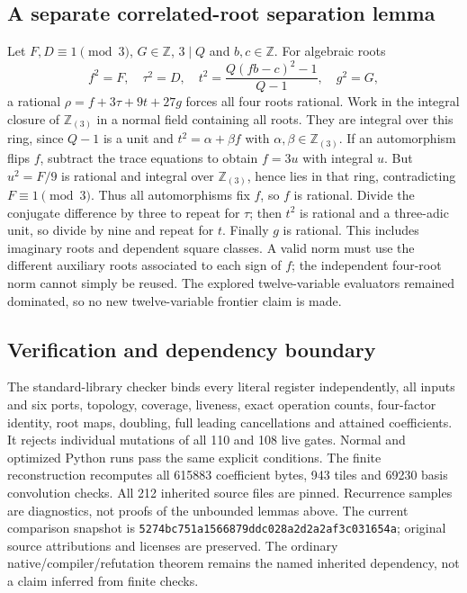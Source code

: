 \subsection{A separate correlated-root separation lemma}
Let $F,D\equiv1\pmod3$, $G\in\mathbb Z$, $3\mid Q$ and $b,c\in\mathbb Z$.
For algebraic roots
\[
 f^2=F,\quad\tau^2=D,\quad
 t^2=\frac{Q(fb-c)^2-1}{Q-1},\quad g^2=G,
\]
a rational $\rho=f+3\tau+9t+27g$ forces all four roots rational.
Work in the integral closure of $\mathbb Z_{(3)}$ in a normal field containing
all roots. They are integral over this ring, since $Q-1$ is a unit and
$t^2=\alpha+\beta f$ with $\alpha,\beta\in\mathbb Z_{(3)}$.
If an automorphism flips $f$, subtract the trace equations to obtain $f=3u$
with integral $u$. But $u^2=F/9$ is rational and integral over $\mathbb Z_{(3)}$,
hence lies in that ring, contradicting $F\equiv1\pmod3$. Thus all automorphisms
fix $f$, so $f$ is rational. Divide the conjugate difference by three to repeat
for $\tau$; then $t^2$ is rational and a three-adic unit, so divide by nine and
repeat for $t$. Finally $g$ is rational. This includes imaginary roots and
dependent square classes. A valid norm must use the different auxiliary roots
associated to each sign of $f$; the independent four-root norm cannot simply be
reused. The explored twelve-variable evaluators remained dominated, so no new
twelve-variable frontier claim is made.

\subsection{Verification and dependency boundary}
The standard-library checker binds every literal register independently, all
inputs and six ports, topology, coverage, liveness, exact operation counts,
four-factor identity, root maps, doubling, full leading cancellations and
attained coefficients. It rejects individual mutations of all 110 and 108 live
gates. Normal and optimized Python runs pass the same explicit conditions.
The finite reconstruction recomputes all 615883 coefficient bytes, 943 tiles and
69230 basis convolution checks. All 212 inherited source files are pinned.
Recurrence samples are diagnostics, not proofs of the unbounded lemmas above.
The current comparison snapshot is
\texttt{5274bc751a1566879ddc028a2d2a2af3c031654a}; original source attributions
and licenses are preserved. The ordinary native/compiler/refutation theorem
remains the named inherited dependency, not a claim inferred from finite checks.
